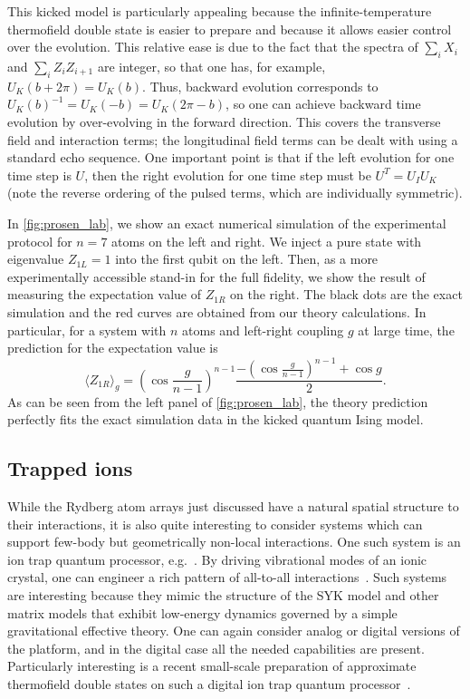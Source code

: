 \documentclass[aps,pra,reprint,floatfix,superscriptaddress, nofootinbib,longbibliography,onecolumn,notitlepage,12pt, tightenlines]{revtex4-1}
\begin{document}
This kicked model is particularly appealing because the infinite-temperature thermofield double state is easier to prepare and because it allows easier control over the evolution. This relative ease is due to the fact that the spectra of $\sum_i X_i$ and $\sum_i Z_i Z_{i+1}$ are integer, so that one has, for example, $U_K(b+2\pi) = U_K(b)$. Thus, backward evolution corresponds to $U_K(b)^{-1} = U_K(-b) = U_K(2\pi-b)$, so one can achieve backward time evolution by over-evolving in the forward direction. This covers the transverse field and interaction terms; the longitudinal field terms can be dealt with using a standard echo sequence. One important point is that if the left evolution for one time step is $U$, then the right evolution for one time step must be $U^T = U_I U_K$ (note the reverse ordering of the pulsed terms, which are individually symmetric).

In \cref{fig:prosen_lab}, we show an exact numerical simulation of the experimental protocol for $n=7$ atoms on the left and right. We inject a pure state with eigenvalue $Z_{1L}=1$ into the first qubit on the left. Then, as a more experimentally accessible stand-in for the full fidelity, we show the result of measuring the expectation value of $Z_{1R}$ on the right. The black dots are the exact simulation and the red curves are obtained from our theory calculations. In particular, for a system with $n$ atoms and left-right coupling $g$ at large time, the prediction for the expectation value is
\begin{equation} \label{eq:zavg_infT}
    \langle Z_{1R}\rangle_g =  \left(\cos \frac{g}{n-1} \right)^{n-1} \frac{- \left(\cos \frac{g}{n-1} \right)^{n-1} + \cos g}{2}.
\end{equation}
As can be seen from the left panel of \cref{fig:prosen_lab}, the theory prediction perfectly fits the exact simulation data in the kicked quantum Ising model.

\subsection{Trapped ions}
While the Rydberg atom arrays just discussed have a natural spatial structure to their interactions, it is also quite interesting to consider systems which can support few-body but geometrically non-local interactions. One such system is an ion trap quantum processor, e.g.~\cite{wright2019benchmarking}. By driving vibrational modes of an ionic crystal, one can engineer a rich pattern of  all-to-all interactions~\cite{davoudi2019analog}. Such systems are interesting because they mimic the structure of the SYK model and other matrix models that exhibit low-energy dynamics governed by a simple gravitational effective theory. One can again consider analog or digital versions of the platform, and in the digital case all the needed capabilities are present. Particularly interesting is a recent small-scale preparation of approximate thermofield double states on such a digital ion trap quantum processor~\cite{zhu2019variational}.
\end{document}
